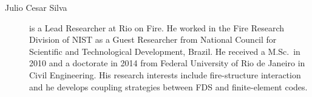\begin{description}



\item[Julio Cesar Silva] is a Lead Researcher at Rio on Fire. He worked in the Fire Research Division of NIST as a Guest Researcher from National Council for Scientific and Technological Development, Brazil. He received a M.Sc.~in 2010 and a doctorate in 2014 from Federal University of Rio de Janeiro in Civil Engineering. His research interests include fire-structure interaction and he develops coupling strategies between FDS and finite-element codes.



\end{description}
